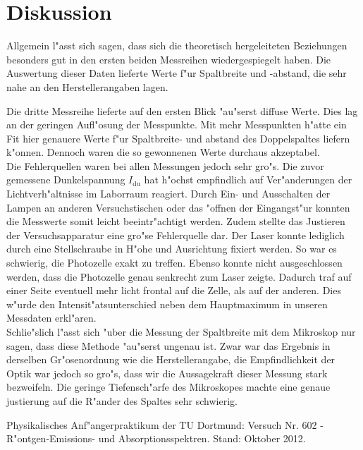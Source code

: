 \section{Diskussion}
	\label{sec:diskussion}

	Allgemein l"asst sich sagen, dass sich die theoretisch hergeleiteten Beziehungen besonders gut in den ersten beiden Messreihen wiedergespiegelt haben.
	Die Auswertung dieser Daten lieferte Werte f"ur Spaltbreite und -abstand, die sehr nahe an den Herstellerangaben lagen.

	Die dritte Messreihe lieferte auf den ersten Blick "au"serst diffuse Werte. Dies lag an der geringen Aufl"osung der Messpunkte.
	Mit mehr Messpunkten h"atte ein Fit hier genauere Werte f"ur Spaltbreite- und abstand des Doppelspaltes liefern k"onnen. Dennoch waren die so gewonnenen Werte durchaus akzeptabel.\\

	Die Fehlerquellen waren bei allen Messungen jedoch sehr gro"s.
	Die zuvor gemessene Dunkelspannung $I_\mathrm{du}$ hat h"ochst empfindlich auf Ver"anderungen der Lichtverh"altnisse im Laborraum reagiert.
	Durch Ein- und Ausschalten der Lampen an anderen Versuchstischen oder das "offnen der Eingangst"ur konnten die Messwerte somit leicht beeintr"achtigt werden.
	Zudem stellte das Justieren der Versuchsapparatur eine gro"se Fehlerquelle dar.
	Der Laser konnte lediglich durch eine Stellschraube in H"ohe und Ausrichtung fixiert werden.
	So war es schwierig, die Photozelle exakt zu treffen.
	Ebenso konnte nicht ausgeschlossen werden, dass die Photozelle genau senkrecht zum Laser zeigte.
	Dadurch traf auf einer Seite eventuell mehr licht frontal auf die Zelle, als auf der anderen.
	Dies w"urde den Intensit"atsunterschied neben dem Hauptmaximum in unseren Messdaten erkl"aren.\\
	
	Schlie"slich l"asst sich "uber die Messung der Spaltbreite mit dem Mikroskop nur sagen, dass diese Methode "au"serst ungenau ist.
	Zwar war das Ergebnis in derselben Gr"osenordnung wie die Herstellerangabe, die Empfindlichkeit der Optik war jedoch so gro"s, dass wir die Aussagekraft dieser Messung stark bezweifeln.
	Die geringe Tiefensch"arfe des Mikroskopes machte eine genaue justierung auf die R"ander des Spaltes sehr schwierig.


	\begin{thebibliography}{9}
		 Physikalisches Anf"angerpraktikum der TU Dortmund: Versuch Nr. 602 - R"ontgen-Emissions- und Absorptionsspektren. Stand: Oktober 2012.
	\end{thebibliography}